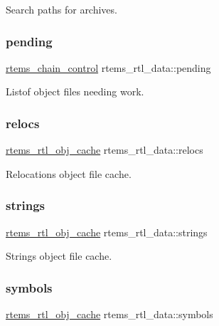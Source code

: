 Search paths for archives. \mbox{\label{structrtems__rtl__data_a7e3fad5f57f980a117ea8933213e4f25}} 
\subsubsection{\texorpdfstring{pending}{pending}}
{\footnotesize\ttfamily \mbox{\hyperlink{unionChain__Control}{rtems\+\_\+chain\+\_\+control}} rtems\+\_\+rtl\+\_\+data\+::pending}

Listof object files needing work. \mbox{\label{structrtems__rtl__data_afa5791d308b1184d25c6f7362c352f80}} 
\subsubsection{\texorpdfstring{relocs}{relocs}}
{\footnotesize\ttfamily \mbox{\hyperlink{structrtems__rtl__obj__cache}{rtems\+\_\+rtl\+\_\+obj\+\_\+cache}} rtems\+\_\+rtl\+\_\+data\+::relocs}

Relocations object file cache. \mbox{\label{structrtems__rtl__data_ad69f90b7ebe3ba71eeea4dcb32cc844b}} 
\subsubsection{\texorpdfstring{strings}{strings}}
{\footnotesize\ttfamily \mbox{\hyperlink{structrtems__rtl__obj__cache}{rtems\+\_\+rtl\+\_\+obj\+\_\+cache}} rtems\+\_\+rtl\+\_\+data\+::strings}

Strings object file cache. \mbox{\label{structrtems__rtl__data_a82b192191cbad1302e7cd556b284cc30}} 
\subsubsection{\texorpdfstring{symbols}{symbols}}
{\footnotesize\ttfamily \mbox{\hyperlink{structrtems__rtl__obj__cache}{rtems\+\_\+rtl\+\_\+obj\+\_\+cache}} rtems\+\_\+rtl\+\_\+data\+::symbols}

